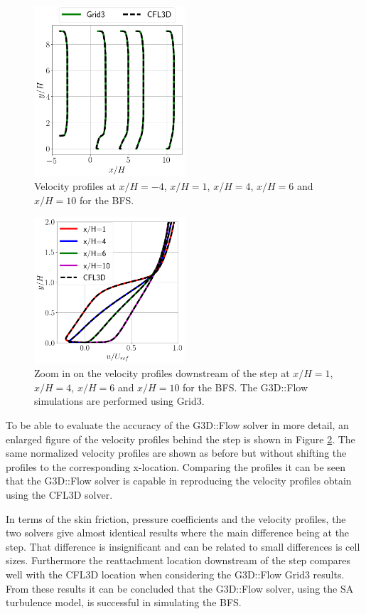 \begin{figure}[h!]
  \centering
  \includegraphics[width=0.5\textwidth]{figures/BFSVel.png}
  \caption{Velocity profiles at $x/H=-4$, $x/H=1$, $x/H=4$, $x/H=6$ and $x/H=10$ for the BFS.} \label{fig:BFSvel}
\end{figure}
\begin{figure}[h!]
  \centering
  \includegraphics[width=0.5\textwidth]{figures/BFSVelBackStep.png}
  \caption{Zoom in on the velocity profiles downstream of the step at $x/H=1$, $x/H=4$, $x/H=6$ and $x/H=10$ for the BFS. The G3D::Flow simulations are performed using Grid3.} \label{fig:BFSvelBackStep}
\end{figure}
To be able to evaluate the accuracy of the G3D::Flow solver in more detail, an enlarged figure of the velocity profiles behind the step is shown in Figure \ref{fig:BFSvelBackStep}. The same normalized velocity profiles are shown as before but without shifting the profiles to the corresponding x-location. Comparing the profiles it can be seen that the G3D::Flow solver is capable in reproducing the velocity profiles obtain using the CFL3D solver. 

In terms of the skin friction, pressure coefficients and the velocity profiles, the two solvers give almost identical results where the main difference being at the step. That difference is insignificant and can be related to small differences is cell sizes. Furthermore the reattachment location downstream of the step compares well with the CFL3D location when considering the G3D::Flow Grid3 results. From these results it can be concluded that the G3D::Flow solver, using the SA turbulence model, is successful in simulating the BFS.
